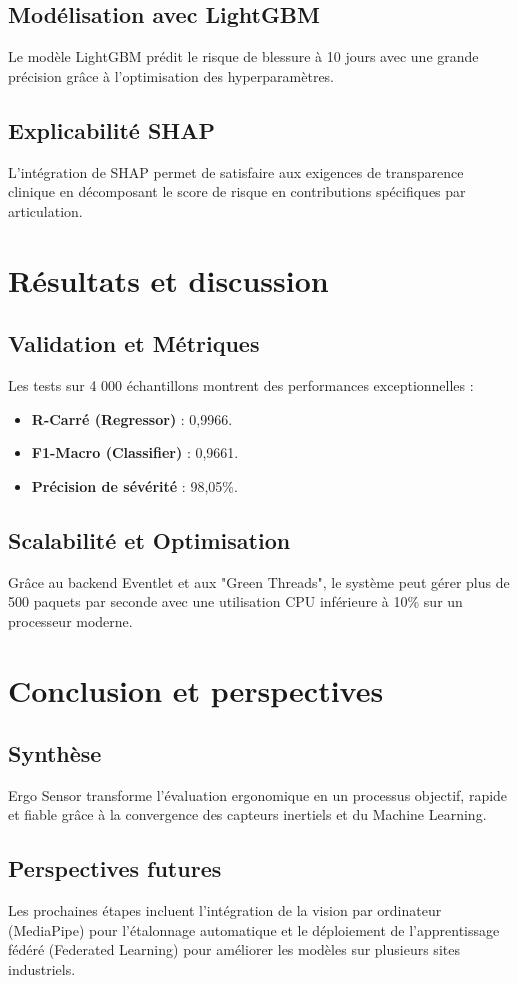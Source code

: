 \documentclass[12pt,a4paper]{report}
\begin{document}
\section{Modélisation avec LightGBM}
Le modèle LightGBM prédit le risque de blessure à 10 jours avec une grande précision grâce à l'optimisation des hyperparamètres.

\section{Explicabilité SHAP}
L'intégration de SHAP \cite{lundberg2017shap} permet de satisfaire aux exigences de transparence clinique en décomposant le score de risque en contributions spécifiques par articulation.

\chapter{Résultats et discussion}
\section{Validation et Métriques}
Les tests sur 4 000 échantillons montrent des performances exceptionnelles :
\begin{itemize}
    \item \textbf{R-Carré (Regressor)} : 0,9966.
    \item \textbf{F1-Macro (Classifier)} : 0,9661.
    \item \textbf{Précision de sévérité} : 98,05\%.
\end{itemize}

\section{Scalabilité et Optimisation}
Grâce au backend Eventlet et aux "Green Threads", le système peut gérer plus de 500 paquets par seconde avec une utilisation CPU inférieure à 10\% sur un processeur moderne.

\chapter{Conclusion et perspectives}
\section{Synthèse}
Ergo Sensor transforme l'évaluation ergonomique en un processus objectif, rapide et fiable grâce à la convergence des capteurs inertiels et du Machine Learning.

\section{Perspectives futures}
Les prochaines étapes incluent l'intégration de la vision par ordinateur (MediaPipe) pour l'étalonnage automatique et le déploiement de l'apprentissage fédéré (Federated Learning) pour améliorer les modèles sur plusieurs sites industriels.

\printbibliography
\end{document}
